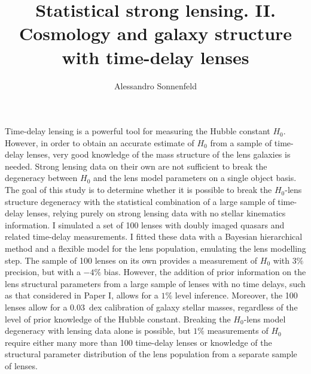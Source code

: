 \documentclass{aa}
\begin{document}
 


   \title{Statistical strong lensing. II. Cosmology and galaxy structure with time-delay lenses}


   \author{Alessandro Sonnenfeld
          }


   \date{}

 
  \abstract
    {
Time-delay lensing is a powerful tool for measuring the Hubble constant $H_0$. However, in order to obtain an accurate estimate of $H_0$ from a sample of time-delay lenses, very good knowledge of the mass structure of the lens galaxies is needed. Strong lensing data on their own are not sufficient to break the degeneracy between $H_0$ and the lens model parameters on a single object basis.
}
   {
The goal of this study is to determine whether it is possible to break the $H_0$-lens structure degeneracy with the statistical combination of a large sample of time-delay lenses, relying purely on strong lensing data with no stellar kinematics information.
} 
   {
I simulated a set of 100 lenses with doubly imaged quasars and related time-delay measurements. I fitted these data with a Bayesian hierarchical method and a flexible model for the lens population, emulating the lens modelling step.
}
   {
The sample of 100 lenses on its own provides a measurement of $H_0$ with $3\%$ precision, but with a $-4\%$ bias.
However, the addition of prior information on the lens structural parameters from a large sample of lenses with no time delays, such as that considered in Paper I, allows for a $1\%$ level inference.
Moreover, the 100 lenses allow for a $0.03$~dex calibration of galaxy stellar masses, regardless of the level of prior knowledge of the Hubble constant.
}
   {
Breaking the $H_0$-lens model degeneracy with lensing data alone is possible, but $1\%$ measurements of $H_0$ require either many more than 100 time-delay lenses or knowledge of the structural parameter distribution of the lens population from a separate sample of lenses.
}
\end{document}
